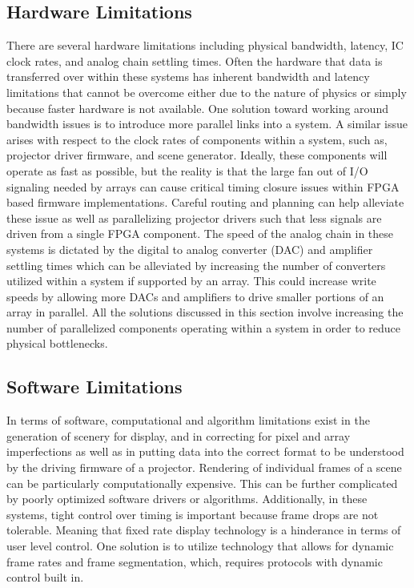     \subsection{Hardware Limitations}
        There are several hardware limitations including physical bandwidth, latency, IC clock rates, and analog chain settling times. Often the hardware that data is transferred over within these systems has inherent bandwidth and latency limitations that cannot be overcome either due to the nature of physics or simply because faster hardware is not available. One solution toward working around bandwidth issues is to introduce more parallel links into a system. A similar issue arises with respect to the clock rates of components within a system, such as, projector driver firmware, and scene generator. Ideally, these components will operate as fast as possible, but the reality is that the large fan out of I/O signaling needed by arrays can cause critical timing closure issues within FPGA based firmware implementations. Careful routing and planning can help alleviate these issue as well as parallelizing projector drivers such that less signals are driven from a single FPGA component. The speed of the analog chain in these systems is dictated by the digital to analog converter (DAC) and amplifier settling times which can be alleviated by increasing the number of converters utilized within a system if supported by an array. This could increase write speeds by allowing more DACs and amplifiers to drive smaller portions of an array in parallel. All the solutions discussed in this section involve increasing the number of parallelized components operating within a system in order to reduce physical bottlenecks.

    \subsection{Software Limitations}
        In terms of software, computational and algorithm limitations exist in the generation of scenery for display, and in correcting for pixel and array imperfections as well as in putting data into the correct format to be understood by the driving firmware of a projector. Rendering of individual frames of a scene can be particularly computationally expensive. This can be further complicated by poorly optimized software drivers or algorithms. Additionally, in these systems, tight control over timing is important because frame drops are not tolerable. Meaning that fixed rate display technology is a hinderance in terms of user level control. One solution is to utilize technology that allows for dynamic frame rates and frame segmentation, which, requires protocols with dynamic control built in.


